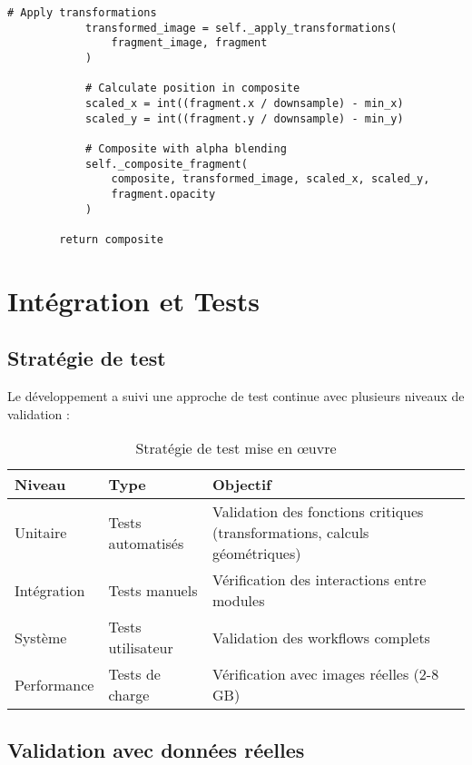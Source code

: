 \documentclass[12pt,a4paper]{report}
\begin{document}
\begin{lstlisting}[caption=Exportation pyramidale optimisée]
            # Apply transformations
            transformed_image = self._apply_transformations(
                fragment_image, fragment
            )
            
            # Calculate position in composite
            scaled_x = int((fragment.x / downsample) - min_x)
            scaled_y = int((fragment.y / downsample) - min_y)
            
            # Composite with alpha blending
            self._composite_fragment(
                composite, transformed_image, scaled_x, scaled_y, 
                fragment.opacity
            )
        
        return composite
\end{lstlisting}

\section{Intégration et Tests}

\subsection{Stratégie de test}

Le développement a suivi une approche de test continue avec plusieurs niveaux de validation :

\begin{table}[H]
\centering
\caption{Stratégie de test mise en œuvre}
\begin{tabular}{@{}llp{6cm}@{}}
\toprule
\textbf{Niveau} & \textbf{Type} & \textbf{Objectif} \\
\midrule
Unitaire & Tests automatisés & Validation des fonctions critiques (transformations, calculs géométriques) \\
Intégration & Tests manuels & Vérification des interactions entre modules \\
Système & Tests utilisateur & Validation des workflows complets \\
Performance & Tests de charge & Vérification avec images réelles (2-8 GB) \\
\bottomrule
\end{tabular}
\label{tab:strategie-test}
\end{table}

\subsection{Validation avec données réelles}
\end{document}
